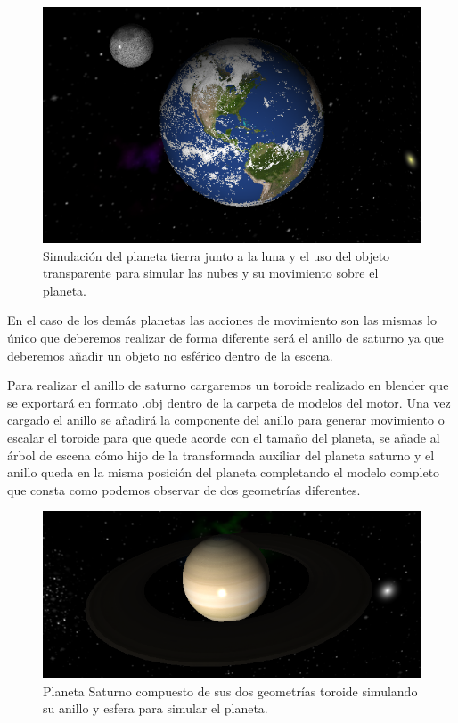 \documentclass[a4paper, 17pt]{book}
\begin{document}
\begin{figure}[H]
    \centering
    \includegraphics[scale=0.35, keepaspectratio]{img/Earth.png}
    \caption{Simulación del planeta tierra junto a la luna y el uso del objeto transparente para simular las nubes y su
    movimiento sobre el planeta.}
    \label{figura:Earth}
\end{figure}

En el caso de los demás planetas las acciones de movimiento son las mismas lo único que deberemos realizar de forma diferente
será el anillo de saturno ya que deberemos añadir un objeto no esférico dentro de la escena.

\vspace{1mm} %

Para realizar el anillo de saturno cargaremos un toroide realizado en blender que se exportará en formato .obj dentro de la carpeta
de modelos del motor. Una vez cargado el anillo se añadirá la componente del anillo para generar movimiento o escalar el toroide
para que quede acorde con el tamaño del planeta, se añade al árbol de escena cómo hijo de la transformada auxiliar del planeta
saturno y el anillo queda en la misma posición del planeta completando el modelo completo que consta como podemos observar de
dos geometrías diferentes.

\begin{figure}[H]
    \centering
    \includegraphics[scale=0.35, keepaspectratio]{img/saturno.png}
    \caption{Planeta Saturno compuesto de sus dos geometrías toroide simulando su anillo y esfera para simular el planeta.}
    \label{figura:saturno}
\end{figure}
\end{document}
